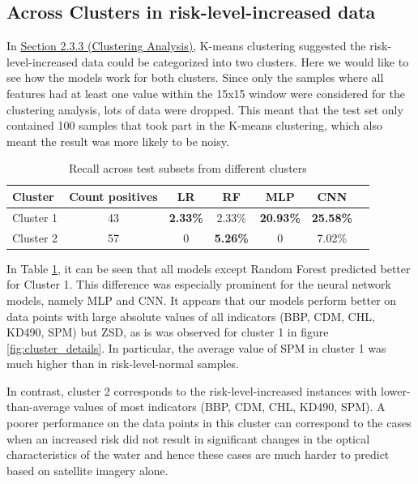 \documentclass[a4paper,11pt]{report}
\begin{document}
\subsection{Across Clusters in risk-level-increased data}
\label{sec:across_clusters}

In \hyperref[sec:clustering]{Section 2.3.3 (Clustering Analysis)}, K-means clustering suggested the risk-level-increased data could be categorized into two clusters. Here we would like to see how the models work for both clusters. Since only the samples where all features had at least one value within the 15x15 window were considered for the clustering analysis, lots of data were dropped. This meant that the test set only contained 100 samples that took part in the K-means clustering, which also meant the result was more likely to be noisy.

\begin{table}[h]
    \caption{Recall across test subsets from different clusters}
    \label{tab:metrics_across_clusters}
    \centering
    \begin{tabular}{lcccccc}
    \toprule
    \textbf{Cluster} & \textbf{Count positives} & \textbf{LR} & \textbf{RF} & \textbf{MLP} & \textbf{CNN} \\
    \midrule
    Cluster 1 & 43 & \textbf{2.33\%} & 2.33\% & \textbf{20.93\%} & \textbf{25.58\%} \\
    Cluster 2 & 57 & 0    & \textbf{5.26\%} & 0    & 7.02\% \\ \bottomrule
    \end{tabular}
\end{table}

In Table \ref{tab:metrics_across_clusters}, it can be seen that all models except Random Forest predicted better for Cluster 1. This difference was especially prominent for the neural network models, namely MLP and CNN. It appears that our models perform better on data points with large absolute values of all indicators (BBP, CDM, CHL, KD490, SPM) but ZSD, as is was observed for cluster 1 in figure \ref{fig:cluster_details}. In particular, the average value of SPM in cluster 1 was much higher than in risk-level-normal samples. 

In contrast, cluster 2 corresponds to the risk-level-increased instances with lower-than-average values of most indicators (BBP, CDM, CHL, KD490, SPM). A poorer performance on the data points in this cluster can correspond to the cases when an increased risk did not result in significant changes in the optical characteristics of the water and hence these cases are much harder to predict based on satellite imagery alone. 
\end{document}
